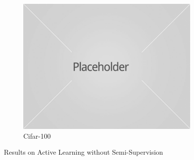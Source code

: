 \documentclass{article}
\begin{document}
\begin{figure}
    \begin{subfigure}[b]{0.3239\textwidth}
        \includegraphics[width=\textwidth]{placeholder1.jpg}
        \caption{Cifar-100}
    \end{subfigure}
    \caption{Results on Active Learning without Semi-Supervision}\label{fig:resnosemi}
\end{figure}
\end{document}
